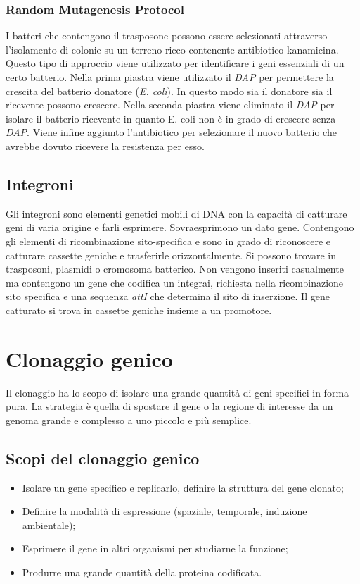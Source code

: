 		\subsubsection{Random Mutagenesis Protocol}
		I batteri che contengono il trasposone possono essere selezionati attraverso l'isolamento di colonie su un terreno ricco contenente antibiotico kanamicina. 
		Questo tipo di approccio viene utilizzato per identificare i geni essenziali di un certo batterio. 
		Nella prima piastra viene utilizzato il \emph{DAP} per permettere la crescita del batterio donatore (\textit{E. coli}). 
		In questo modo sia il donatore sia il ricevente possono crescere. 
		Nella seconda piastra viene eliminato il \emph{DAP} per isolare il batterio ricevente in quanto E. coli non \`e in grado di crescere senza \emph{DAP}.
		Viene infine aggiunto l'antibiotico per selezionare il nuovo batterio che avrebbe dovuto ricevere la resistenza per esso.

	\subsection{Integroni}
	Gli integroni sono elementi genetici mobili di DNA con la capacit\`a di catturare geni di varia origine e farli esprimere.
	Sovraesprimono un dato gene.
	Contengono gli elementi di ricombinazione sito-specifica e sono in grado di riconoscere e catturare cassette geniche e trasferirle orizzontalmente.
	Si possono trovare in trasposoni, plasmidi o cromosoma batterico.
	Non vengono inseriti casualmente ma contengono un gene che codifica un integrai, richiesta nella ricombinazione sito specifica e una sequenza \emph{attI} che determina il sito di inserzione.
	Il gene catturato si trova in cassette geniche insieme a un promotore.
 
\section{Clonaggio genico}
Il clonaggio ha lo scopo di isolare una grande quantità di geni specifici in forma pura. 
La strategia è quella di spostare il gene o la regione di interesse da un genoma grande e complesso a uno piccolo e più semplice. 

	\subsection{Scopi del clonaggio genico}
	\begin{multicols}{2}
		\begin{itemize}
   			\item Isolare un gene specifico e replicarlo, definire la struttura del gene clonato;
    			\item Definire la modalità di espressione (spaziale, temporale, induzione ambientale); 
    			\item Esprimere il gene in altri organismi per studiarne la funzione;
    			\item Produrre una grande quantità della proteina codificata.
		\end{itemize}
	\end{multicols}

